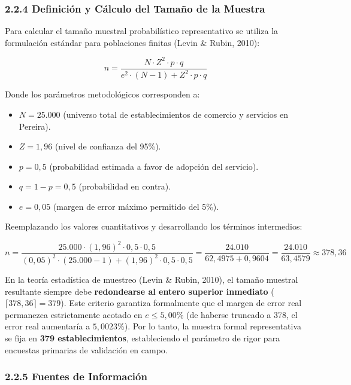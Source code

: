 \documentclass[12pt,letterpaper]{article}
\begin{document}
\subsubsection{2.2.4 Definición y Cálculo del Tamaño de la Muestra}

Para calcular el tamaño muestral probabilístico representativo se utiliza la formulación estándar para poblaciones finitas (Levin \& Rubin, 2010):

\begin{equation}
n = \frac{N \cdot Z^2 \cdot p \cdot q}{e^2 \cdot (N - 1) + Z^2 \cdot p \cdot q}
\end{equation}

Donde los parámetros metodológicos corresponden a:
\begin{itemize}[leftmargin=1.5em, itemsep=1pt]
    \item $N = 25.000$ (universo total de establecimientos de comercio y servicios en Pereira).
    \item $Z = 1,96$ (nivel de confianza del 95\%).
    \item $p = 0,5$ (probabilidad estimada a favor de adopción del servicio).
    \item $q = 1 - p = 0,5$ (probabilidad en contra).
    \item $e = 0,05$ (margen de error máximo permitido del 5\%).
\end{itemize}

Reemplazando los valores cuantitativos y desarrollando los términos intermedios:

\begin{equation}
n = \frac{25.000 \cdot (1,96)^2 \cdot 0,5 \cdot 0,5}{(0,05)^2 \cdot (25.000 - 1) + (1,96)^2 \cdot 0,5 \cdot 0,5} = \frac{24.010}{62,4975 + 0,9604} = \frac{24.010}{63,4579} \approx 378,36
\end{equation}

En la teoría estadística de muestreo (Levin \& Rubin, 2010), el tamaño muestral resultante siempre debe \textbf{redondearse al entero superior inmediato} ($\lceil 378,36 \rceil = 379$). Este criterio garantiza formalmente que el margen de error real permanezca estrictamente acotado en $e \le 5,00\%$ (de haberse truncado a 378, el error real aumentaría a $5,0023\%$). Por lo tanto, la muestra formal representativa se fija en \textbf{379 establecimientos}, estableciendo el parámetro de rigor para encuestas primarias de validación en campo.

\subsubsection{2.2.5 Fuentes de Información}
\end{document}
